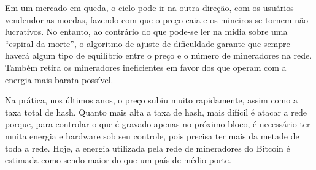 Em um mercado em queda, o ciclo pode ir na outra direção, com os usuários vendendor as moedas, fazendo com que o preço caia e os mineiros se tornem não lucrativos. No entanto, ao contrário do que pode-se ler na mídia sobre uma “espiral da morte”, o algoritmo de ajuste de dificuldade garante que sempre haverá algum tipo de equilíbrio entre o preço e o número de mineradores na rede. Também retira os mineradores ineficientes em favor dos que operam com a energia mais barata possível.

Na prática, nos últimos anos, o preço subiu muito rapidamente, assim como a taxa total de hash. Quanto mais alta a taxa de hash, mais difícil é atacar a rede porque, para controlar o que é gravado apenas no próximo bloco, é necessário ter muita energia e hardware sob seu controle, pois precisa ter mais da metade de toda a rede. Hoje, a energia utilizada pela rede de mineradores do Bitcoin é estimada como sendo maior do que um país de médio porte.